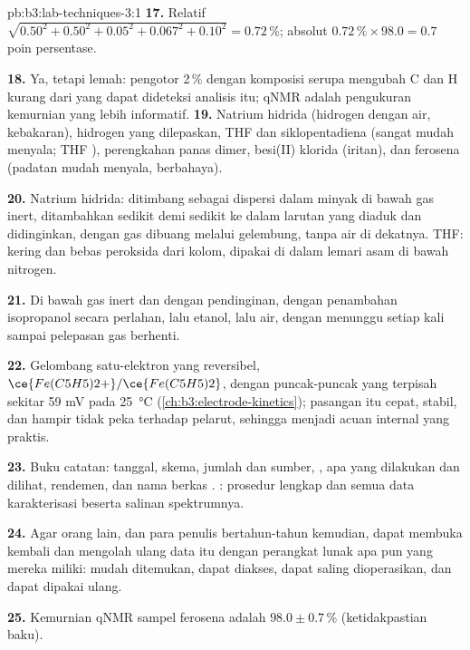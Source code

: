 \begin{solution}{pb:b3:lab-techniques-3:1}
\textbf{17.} Relatif $\sqrt{0.50^2 + 0.50^2 + 0.05^2 + 0.067^2 + 0.10^2} = 0.72$\,\%; absolut $0.72\,\% \times 98.0 = 0.7$ poin persentase.

\textbf{18.} Ya, tetapi lemah: pengotor 2\,\% dengan komposisi serupa mengubah C dan H kurang
dari yang dapat dideteksi analisis itu; qNMR adalah pengukuran kemurnian yang lebih informatif.
\textbf{19.} Natrium hidrida (hidrogen dengan air, kebakaran), hidrogen yang dilepaskan, THF dan
siklopentadiena (sangat mudah menyala; THF ), perengkahan panas
dimer, besi(II) klorida (iritan), dan ferosena (padatan mudah menyala, berbahaya).

\textbf{20.} Natrium hidrida: ditimbang sebagai dispersi dalam minyak di bawah gas inert, ditambahkan sedikit
demi sedikit ke dalam larutan yang diaduk dan didinginkan, dengan gas dibuang melalui gelembung, tanpa air
di dekatnya. THF: kering dan bebas peroksida dari kolom, dipakai di dalam lemari asam di bawah nitrogen.

\textbf{21.} Di bawah gas inert dan dengan pendinginan, dengan penambahan isopropanol secara perlahan, lalu
etanol, lalu air, dengan menunggu setiap kali sampai pelepasan gas berhenti.

\textbf{22.} Gelombang satu-elektron yang reversibel, $\ce{Fe(C5H5)2+}/\ce{Fe(C5H5)2}$, dengan puncak-puncak yang terpisah sekitar 59 mV pada \qty{25}{\celsius}
(\cref{ch:b3:electrode-kinetics}); pasangan itu cepat, stabil, dan hampir tidak peka terhadap
pelarut, sehingga menjadi acuan internal yang praktis.

\textbf{23.} Buku catatan: tanggal, skema, jumlah dan sumber, , apa yang
dilakukan dan dilihat, rendemen, dan nama berkas . : prosedur lengkap dan semua data karakterisasi beserta salinan
spektrumnya.

\textbf{24.} Agar orang lain, dan para penulis bertahun-tahun kemudian, dapat membuka kembali dan mengolah ulang data itu
dengan perangkat lunak apa pun yang mereka miliki: mudah ditemukan, dapat diakses, dapat saling dioperasikan, dan dapat dipakai ulang.

\textbf{25.} Kemurnian qNMR sampel ferosena adalah $98.0 \pm 0.7$\,\% (ketidakpastian baku).
\end{solution}

